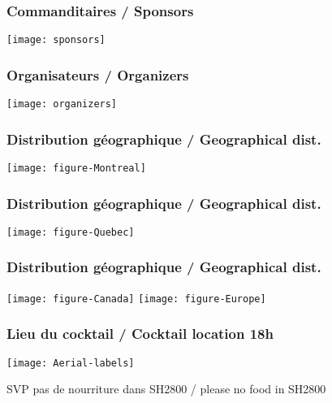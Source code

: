 \documentclass{beamer}
\begin{document}




\begin{frame}
  \frametitle{Commanditaires / Sponsors}
  \texttt{[image: sponsors]}
\end{frame}

\begin{frame}
  \frametitle{Organisateurs / Organizers}
  \texttt{[image: organizers]}
\end{frame}

\begin{frame}
  \frametitle{Distribution g\'eographique / Geographical dist.}
  \texttt{[image: figure-Montreal]}
\end{frame}

\begin{frame}
  \frametitle{Distribution g\'eographique / Geographical dist.}
  \texttt{[image: figure-Quebec]}
\end{frame}

\begin{frame}
  \frametitle{Distribution g\'eographique / Geographical dist.}
  \texttt{[image: figure-Canada]}
  \texttt{[image: figure-Europe]}
\end{frame}

\begin{frame}
  \frametitle{Lieu du cocktail / Cocktail location 18h}
  \texttt{[image: Aerial-labels]}

  SVP pas de nourriture dans SH2800 / please no food in SH2800
\end{frame}
\end{document}

